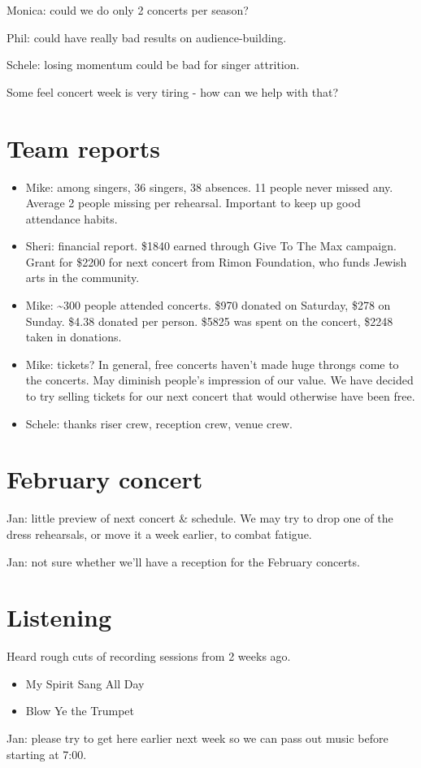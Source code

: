 \documentclass[11pt]{article}
\begin{document}
Monica: could we do only 2 concerts per season?

Phil: could have really bad results on audience-building.

Schele: losing momentum could be bad for singer attrition.

Some feel concert week is very tiring - how can we help with that?
\section{Team reports}
\label{sec-3}


\begin{itemize}
\item Mike: among singers, 36 singers, 38 absences.  11 people never missed any.
  Average 2 people missing per rehearsal.  Important to keep up good
  attendance habits.
\item Sheri: financial report.  \$1840 earned through Give To The Max
  campaign.  Grant for \$2200 for next concert from Rimon Foundation,
  who funds Jewish arts in the community.
\item Mike: \~{}300 people attended concerts.  \$970 donated on Saturday, \$278
  on Sunday.  \$4.38 donated per person.  \$5825 was spent on the
  concert, \$2248 taken in donations.
\item Mike: tickets?  In general, free concerts haven't made huge throngs
  come to the concerts.  May diminish people's impression of our
  value.  We have decided to try selling tickets for our next concert
  that would otherwise have been free.
\item Schele: thanks riser crew, reception crew, venue crew.
\end{itemize}
\section{February concert}
\label{sec-4}


Jan: little preview of next concert \& schedule.  We may try to drop
one of the dress rehearsals, or move it a week earlier, to combat
fatigue.

Jan: not sure whether we'll have a reception for the February
concerts.
\section{Listening}
\label{sec-5}


Heard rough cuts of recording sessions from 2 weeks ago.

\begin{itemize}
\item My Spirit Sang All Day
\item Blow Ye the Trumpet
\end{itemize}

Jan: please try to get here earlier next week so we can pass out music
before starting at 7:00.
\end{document}
